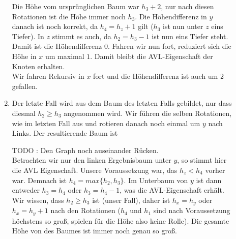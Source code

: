 \documentclass[11pt,a4paper,ngerman]{article}
\begin{document}
\begin{description}
\begin{enumerate}[1. {Fall:}]
      Die Höhe vom ursprünglichen Baum war $h_3 + 2$, nur nach diesen Rotationen ist die Höhe immer noch $h_3$. Die Höhendifferenz in $y$ danach ist noch
      korrekt, da $h_4 = h_z + 1$ gilt ($h_3$ ist nun unter $z$ eins Tiefer).
      In $z$ stimmt es auch, da $h_2 = h_3 - 1$ ist nun eins Tiefer steht. Damit ist die Höhendifferenz $0$. Fahren wir nun fort, reduziert sich die Höhe
      in $x$ um maximal $1$. Damit bleibt die AVL-Eigenschaft der Knoten erhalten.\\

      Wir fahren Rekursiv in $x$ fort und die Höhendifferenz ist auch um $2$ gefallen.

      \item Der letzte Fall wird aus dem Baum des letzten Falls gebildet, nur dass diesmal $h_2 \geq h_3$ angenommen wird. Wir führen die selben Rotationen,
         wie im letzten Fall aus und rotieren danach noch einmal um $y$ nach Links. Der resultierende Baum ist

      \begin{center}
      \end{center}

      TODO : Den Graph noch auseinander Rücken.\\

      Betrachten wir nur den linken Ergebnisbaum unter $y$, so stimmt hier die AVL Eigenschaft. Unsere Voraussetzung war, das $h_z < h_4$ vorher war. Demnach ist
      $h_4 = max\{ h_2, h_3 \}$. Im Unterbaum von $y$ ist dann entweder $h_3 = h_4$ oder $h_3 = h_4 - 1$, was die AVL-Eigenschaft erhält.\\
   
      Wir wissen, dass $h_2 \geq h_3$ ist (unser Fall), daher ist $h_x = h_y$ oder $h_x = h_y +1$ nach den Rotationen ($h_4$ und $h_1$ sind nach Voraussetzung höchstens so groß, spielen
      für die Höhe also keine Rolle). Die gesamte Höhe von des Baumes ist immer noch genau so groß.


\end{enumerate}
\end{description}
\end{document}
